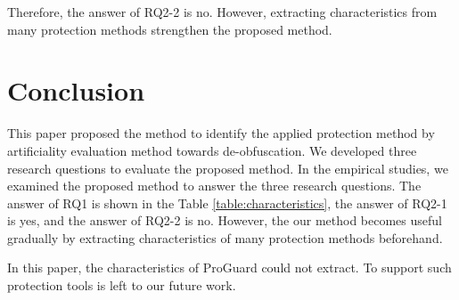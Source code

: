 \documentclass[conference]{IEEEtran}
\begin{document}
Therefore, the answer of RQ2-2 is no. However, extracting
characteristics from many protection methods strengthen the proposed
method.

% 
% 
% 


\section{Conclusion}\label{sect:conclusion}

This paper proposed the method to identify the applied protection
method by artificiality evaluation method towards de-obfuscation.  We
developed three research questions to evaluate the proposed method.
In the empirical studies, we examined the proposed method to answer
the three research questions.  The answer of RQ1 is shown in the
Table \ref{table:characteristics}, the answer of RQ2-1 is yes, and the
answer of RQ2-2 is no.  However, the our method becomes useful
gradually by extracting characteristics of many protection methods
beforehand.

In this paper, the characteristics of ProGuard could not extract.
To support such protection tools is left to our future work.






\end{document}
